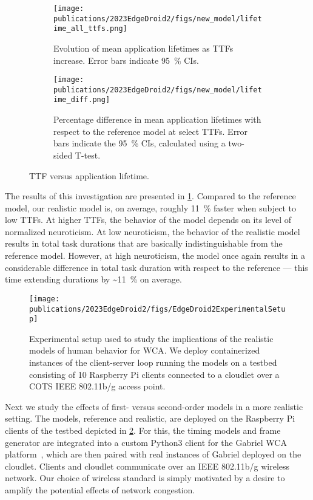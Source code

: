 \begin{figure}
    \centering
    \begin{subfigure}[t]{.45\textwidth}
        \centering
        \texttt{[image: publications/2023EdgeDroid2/figs/new\_model/lifetime\_all\_ttfs.png]}
        \caption{%
            Evolution of mean application lifetimes as \glspl{TTF} increase.
            Error bars indicate \SI{95}{\percent} \glspl{CI}.
        }
    \end{subfigure}%
    \hfill%
    \begin{subfigure}[t]{.45\textwidth}
        \centering
        \texttt{[image: publications/2023EdgeDroid2/figs/new\_model/lifetime\_diff.png]}
        \caption{%
            Percentage difference in mean application lifetimes with respect to the reference model at select \glspl{TTF}.
            Error bars indicate the \SI{95}{\percent} \glspl{CI}, calculated using a two-sided T-test.
        }
    \end{subfigure}
    \caption{\gls{TTF} versus application lifetime.}\label{fig:lifetimes}
\end{figure}

The results of this investigation are presented in \cref{fig:lifetimes}.
Compared to the reference model, our realistic model is, on average, roughly \SI{11}{\percent} faster when subject to low \glspl{TTF}.
At higher \glspl{TTF}, the behavior of the model depends on its level of normalized neuroticism.
At low neuroticism, the behavior of the realistic model results in total task durations that are basically indistinguishable from the reference model.
However, at high neuroticism, the model once again results in a considerable difference in total task duration with respect to the reference --- this time extending durations by \textasciitilde\SI{11}{\percent} on average.

\begin{figure}
    \centering
    \texttt{[image: publications/2023EdgeDroid2/figs/EdgeDroid2ExperimentalSetup]}
    \caption{%
        Experimental setup used to study the implications of the realistic models of human behavior for \gls{WCA}.
        We deploy containerized instances of the client-server loop running the models on a testbed consisting of \num{10} Raspberry Pi clients connected to a cloudlet over a \gls{COTS} \gls{IEEE} \num{802.11}b/g access point.
    }\label{fig:expsetup}
\end{figure}

Next we study the effects of first- versus second-order models in a more realistic setting.
The models, reference and realistic, are deployed on the Raspberry Pi clients of the testbed depicted in \cref{fig:expsetup}.
For this, the timing models and frame generator are integrated into a custom Python3 client for the Gabriel \gls{WCA} platform~\cite{chen2018application}, which are then paired with real instances of Gabriel deployed on the cloudlet.
Clients and cloudlet communicate over an \gls{IEEE} \num{802.11}b/g wireless network.
Our choice of wireless standard is simply motivated by a desire to amplify the potential effects of network congestion.

